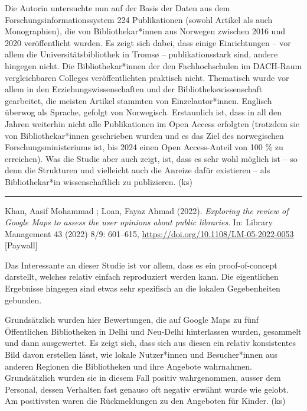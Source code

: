 \documentclass[a4paper,
fontsize=11pt,
oneside,
numbers=noperiodatend,
parskip=half-,
bibliography=totoc,
final
]{scrartcl}
\begin{document}
Die Autorin untersuchte nun auf der Basis der Daten aus dem
Forschungsinformationssystem 224 Publikationen (sowohl Artikel als auch
Monographien), die von Bibliothekar*innen aus Norwegen zwischen 2016 und
2020 veröffentlicht wurden. Es zeigt sich dabei, dass einige
Einrichtungen -- vor allem die Universitätsbibliothek in Tromsø --
publikationsstark sind, andere hingegen nicht. Die Bibliothekar*innen
der den Fachhochschulen im DACH-Raum vergleichbaren Colleges
veröffentlichten praktisch nicht. Thematisch wurde vor allem in den
Erziehungswissenschaften und der Bibliothekswissenschaft gearbeitet, die
meisten Artikel stammten von Einzelautor*innen. Englisch überwog als
Sprache, gefolgt von Norwegisch. Erstaunlich ist, dass in all den Jahren
weiterhin nicht alle Publikationen im Open Access erfolgten (trotzdem
sie von Bibliothekar*innen geschrieben wurden und es das Ziel des
norwegischen Forschungsministeriums ist, bis 2024 einen Open
Access-Anteil von 100 \% zu erreichen). Was die Studie aber auch zeigt,
ist, dass es sehr wohl möglich ist -- so denn die Strukturen und
vielleicht auch die Anreize dafür existieren -- als Bibliothekar*in
wissenschaftlich zu publizieren. (ks)

\begin{center}\rule{0.5\linewidth}{0.5pt}\end{center}

Khan, Aasif Mohammad ; Loan, Fayaz Ahmad (2022). \emph{Exploring the
review of Google Maps to assess the user opinions about public
libraries}. In: Library Management 43 (2022) 8/9: 601--615,
\url{https://doi.org/10.1108/LM-05-2022-0053} {[}Paywall{]}

Das Interessante an dieser Studie ist vor allem, dass es ein
proof-of-concept darstellt, welches relativ einfach reproduziert werden
kann. Die eigentlichen Ergebnisse hingegen sind etwas sehr spezifisch an
die lokalen Gegebenheiten gebunden.

Grundsätzlich wurden hier Bewertungen, die auf Google Maps zu fünf
Öffentlichen Bibliotheken in Delhi und Neu-Delhi hinterlassen wurden,
gesammelt und dann ausgewertet. Es zeigt sich, dass sich aus diesen ein
relativ konsistentes Bild davon erstellen lässt, wie lokale Nutzer*innen
und Besucher*innen aus anderen Regionen die Bibliotheken und ihre
Angebote wahrnahmen. Grundsätzlich wurden sie in diesem Fall positiv
wahrgenommen, ausser dem Personal, dessen Verhalten fast genauso oft
negativ erwähnt wurde wie gelobt. Am positivsten waren die Rückmeldungen
zu den Angeboten für Kinder. (ks)
\end{document}
